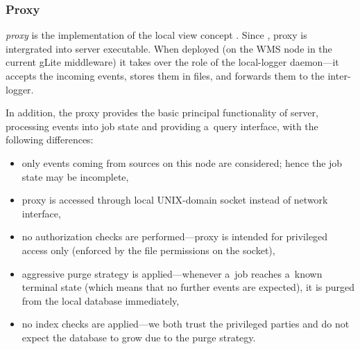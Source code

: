 
\subsubsection{Proxy}

\emph{\LB proxy} is the implementation of the local view concept
\ifx\insideUG{}.\fi
Since \LBnew, \LB proxy is intergrated into \LB server 
executable.
When deployed (on the WMS node in the current gLite middleware) 
it takes over the role of the local-logger daemon---it accepts the incoming
events, stores them in files, and forwards them to the inter-logger.

In addition, the proxy provides the basic principal functionality of \LB server,
\ie processing events into job state and providing a~query interface,
with the following differences:
\begin{itemize}
\item only events coming from sources on this node are considered; hence
the job state may be incomplete,
\item proxy is accessed through local UNIX-domain socket instead of network
interface,
\item no authorization checks are performed---proxy is intended for
privileged access only (enforced by the file permissions on the socket),
\item aggressive purge strategy is applied---whenever a~job reaches
a~known terminal state (which means that no further events are expected), it is purged
from the local database immediately,
\item no index checks are applied---we both trust the privileged parties
and do not expect the database to grow due to the purge strategy.
\end{itemize}

